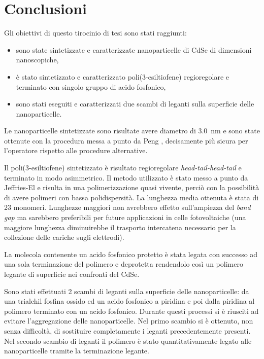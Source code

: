 \chapter{Conclusioni}

Gli obiettivi di questo tirocinio di tesi sono stati raggiunti:
\begin{itemize}
 \item sono state sintetizzate e caratterizzate nanoparticelle di CdSe di dimensioni nanoscopiche,
 \item è stato sintetizzato e caratterizzato poli(3-esiltiofene) regioregolare e terminato con singolo gruppo di acido fosfonico,
 \item sono stati eseguiti e caratterizzati due scambi di leganti sulla superficie delle nanoparticelle.
\end{itemize}
Le nanoparticelle sintetizzate sono risultate avere diametro di 3.0~nm e sono state ottenute con la procedura messa a punto da Peng \etal  \cite{qd-CdSe-CdO}, decisamente più sicura per l'operatore rispetto alle procedure alternative. 

Il poli(3-esiltiofene) sintetizzato è risultato regioregolare \emph{head-tail-head-tail} e terminato in modo asimmetrico. Il metodo utilizzato è stato messo a punto da Jeffries-El \etal \cite{pol-p3ht-end} e risulta in una polimerizzazione quasi vivente, perciò con la possibilità di avere polimeri con bassa polidispersità. La lunghezza media ottenuta è stata di 23 monomeri. Lunghezze maggiori non avrebbero effetto sull'ampiezza del \emph{band gap} ma sarebbero preferibili per future applicazioni in celle fotovoltaiche (una maggiore lunghezza diminuirebbe il trasporto intercatena necessario per la collezione delle cariche sugli elettrodi). 

La molecola contenente un acido fosfonico protetto è stata legata con successo ad una sola terminazione del polimero e deprotetta rendendolo così un polimero legante di superficie nei confronti del CdSe.

Sono stati effettuati 2 scambi di leganti sulla superficie delle nanoparticelle: da una trialchil fosfina ossido ed un acido fosfonico a piridina e poi dalla piridina al polimero terminato con un acido fosfonico. Durante questi processi si è riusciti ad evitare l'aggregazione delle nanoparticelle. Nel primo scambio si è ottenuto, non senza difficoltà, di sostituire completamente i leganti precedentemente presenti. Nel secondo scambio di leganti {%
 il polimero è stato quantitativamente legato alle nanoparticelle tramite la terminazione legante.}

